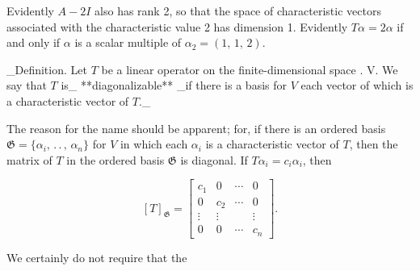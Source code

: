 Evidently \(A-2I\) also has rank 2, so that the space of characteristic vectors associated with the characteristic value 2 has dimension 1. Evidently \(T\alpha=2\alpha\) if and only if \(\alpha\) is a scalar multiple of \(\alpha_{2}=(1,\,1,\,2)\).

_Definition. Let \(T\) be a linear operator on the finite-dimensional space . V. We say that \(T\) is_ **diagonalizable** _if there is a basis for \(V\) each vector of which is a characteristic vector of \(T\)._

The reason for the name should be apparent; for, if there is an ordered basis \(\mathfrak{G}=\{\alpha_{i},\,.\,.\,,\,\alpha_{n}\}\) for \(V\) in which each \(\alpha_{i}\) is a characteristic vector of \(T\), then the matrix of \(T\) in the ordered basis \(\mathfrak{G}\) is diagonal. If \(T\alpha_{i}=c_{i}\alpha_{i}\), then

\[[T]_{\mathfrak{G}}=\begin{bmatrix}c_{1}&0&\cdots&0\\ 0&c_{2}&\cdots&0\\ \vdots&\vdots&&\vdots\\ 0&0&\cdots&c_{n}\end{bmatrix}.\]

We certainly do not require that the 